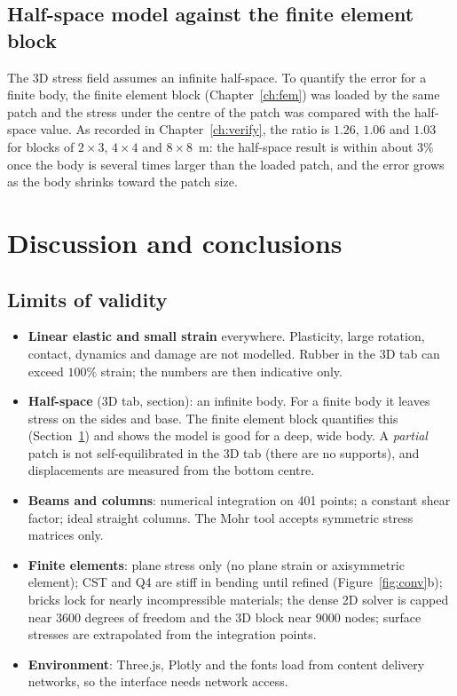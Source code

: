 \section{Half-space model against the finite element block}
\label{sec:halfvs}
The 3D stress field assumes an infinite half-space. To quantify the error for a finite body, the finite element block (Chapter~\ref{ch:fem}) was loaded by the same patch and the stress under the centre of the patch was compared with the half-space value. As recorded in Chapter~\ref{ch:verify}, the ratio is $1.26$, $1.06$ and $1.03$ for blocks of $2\times3$, $4\times4$ and $8\times8$~m: the half-space result is within about $3\%$ once the body is several times larger than the loaded patch, and the error grows as the body shrinks toward the patch size.

\chapter{Discussion and conclusions}
\label{ch:discuss}

\section{Limits of validity}
\begin{itemize}
\item \textbf{Linear elastic and small strain} everywhere. Plasticity, large rotation, contact, dynamics and damage are not modelled. Rubber in the 3D tab can exceed $100\%$ strain; the numbers are then indicative only.
\item \textbf{Half-space} (3D tab, section): an infinite body. For a finite body it leaves stress on the sides and base. The finite element block quantifies this (Section~\ref{sec:halfvs}) and shows the model is good for a deep, wide body. A \emph{partial} patch is not self-equilibrated in the 3D tab (there are no supports), and displacements are measured from the bottom centre.
\item \textbf{Beams and columns}: numerical integration on 401 points; a constant shear factor; ideal straight columns. The Mohr tool accepts symmetric stress matrices only.
\item \textbf{Finite elements}: plane stress only (no plane strain or axisymmetric element); CST and Q4 are stiff in bending until refined (Figure~\ref{fig:conv}b); bricks lock for nearly incompressible materials; the dense 2D solver is capped near 3600 degrees of freedom and the 3D block near 9000 nodes; surface stresses are extrapolated from the integration points.
\item \textbf{Environment}: Three.js, Plotly and the fonts load from content delivery networks, so the interface needs network access.
\end{itemize}

